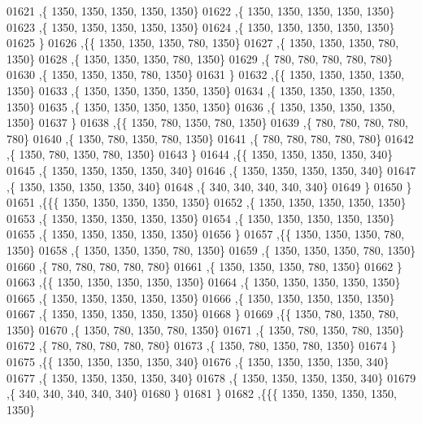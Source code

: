 \begin{DoxyCode}
01621    ,\{  1350,  1350,  1350,  1350,  1350\}
01622    ,\{  1350,  1350,  1350,  1350,  1350\}
01623    ,\{  1350,  1350,  1350,  1350,  1350\}
01624    ,\{  1350,  1350,  1350,  1350,  1350\}
01625    \}
01626   ,\{\{  1350,  1350,  1350,   780,  1350\}
01627    ,\{  1350,  1350,  1350,   780,  1350\}
01628    ,\{  1350,  1350,  1350,   780,  1350\}
01629    ,\{   780,   780,   780,   780,   780\}
01630    ,\{  1350,  1350,  1350,   780,  1350\}
01631    \}
01632   ,\{\{  1350,  1350,  1350,  1350,  1350\}
01633    ,\{  1350,  1350,  1350,  1350,  1350\}
01634    ,\{  1350,  1350,  1350,  1350,  1350\}
01635    ,\{  1350,  1350,  1350,  1350,  1350\}
01636    ,\{  1350,  1350,  1350,  1350,  1350\}
01637    \}
01638   ,\{\{  1350,   780,  1350,   780,  1350\}
01639    ,\{   780,   780,   780,   780,   780\}
01640    ,\{  1350,   780,  1350,   780,  1350\}
01641    ,\{   780,   780,   780,   780,   780\}
01642    ,\{  1350,   780,  1350,   780,  1350\}
01643    \}
01644   ,\{\{  1350,  1350,  1350,  1350,   340\}
01645    ,\{  1350,  1350,  1350,  1350,   340\}
01646    ,\{  1350,  1350,  1350,  1350,   340\}
01647    ,\{  1350,  1350,  1350,  1350,   340\}
01648    ,\{   340,   340,   340,   340,   340\}
01649    \}
01650   \}
01651  ,\{\{\{  1350,  1350,  1350,  1350,  1350\}
01652    ,\{  1350,  1350,  1350,  1350,  1350\}
01653    ,\{  1350,  1350,  1350,  1350,  1350\}
01654    ,\{  1350,  1350,  1350,  1350,  1350\}
01655    ,\{  1350,  1350,  1350,  1350,  1350\}
01656    \}
01657   ,\{\{  1350,  1350,  1350,   780,  1350\}
01658    ,\{  1350,  1350,  1350,   780,  1350\}
01659    ,\{  1350,  1350,  1350,   780,  1350\}
01660    ,\{   780,   780,   780,   780,   780\}
01661    ,\{  1350,  1350,  1350,   780,  1350\}
01662    \}
01663   ,\{\{  1350,  1350,  1350,  1350,  1350\}
01664    ,\{  1350,  1350,  1350,  1350,  1350\}
01665    ,\{  1350,  1350,  1350,  1350,  1350\}
01666    ,\{  1350,  1350,  1350,  1350,  1350\}
01667    ,\{  1350,  1350,  1350,  1350,  1350\}
01668    \}
01669   ,\{\{  1350,   780,  1350,   780,  1350\}
01670    ,\{  1350,   780,  1350,   780,  1350\}
01671    ,\{  1350,   780,  1350,   780,  1350\}
01672    ,\{   780,   780,   780,   780,   780\}
01673    ,\{  1350,   780,  1350,   780,  1350\}
01674    \}
01675   ,\{\{  1350,  1350,  1350,  1350,   340\}
01676    ,\{  1350,  1350,  1350,  1350,   340\}
01677    ,\{  1350,  1350,  1350,  1350,   340\}
01678    ,\{  1350,  1350,  1350,  1350,   340\}
01679    ,\{   340,   340,   340,   340,   340\}
01680    \}
01681   \}
01682  ,\{\{\{  1350,  1350,  1350,  1350,  1350\}

\end{DoxyCode}
